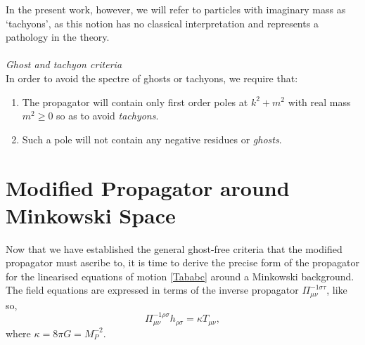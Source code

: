 In the present work, however, we will refer to particles with imaginary mass as `tachyons', as this notion has no classical interpretation and represents a pathology in the theory. 
\\\\\emph{Ghost and tachyon criteria}\\
In order to avoid the spectre of ghosts or tachyons, we require that: \begin{enumerate}
\item The propagator will contain only first order poles at $k^2+m^2$ with real mass $m^2\geq0$ so as to avoid \emph{tachyons}.
\item Such a pole will not contain any negative residues or \emph{ghosts}.
\end{enumerate}
\section{Modified Propagator around Minkowski Space}
\label{sec:prop}
Now that we have established the general ghost-free criteria that the modified propagator must ascribe to, it is time to derive the precise form of the propagator for the linearised equations of motion \eqref{Tababc} around a Minkowski background. The field equations are expressed in terms of the inverse propagator $\Pi^{-1\sigma\tau}_{\mu\nu}$, like so,
\[
\label{inversePi}
\Pi^{-1\rho\sigma}_{\mu\nu}h_{\rho\sigma}=\kappa T_{\mu\nu}
,\]
where $\kappa=8\pi G=M_P^{-2}$.
